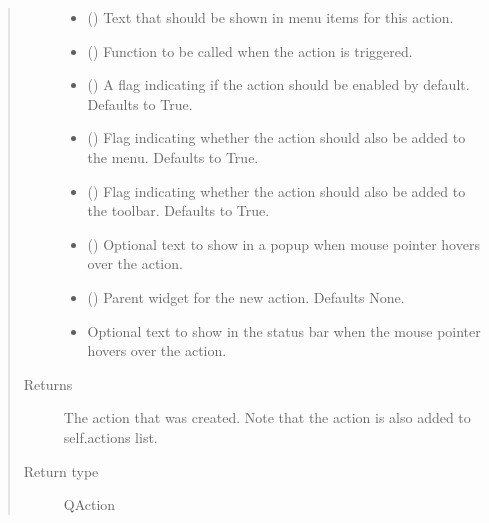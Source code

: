 \documentclass[letterpaper,10pt,english]{sphinxmanual}
\begin{document}
\begin{fulllineitems}
\begin{fulllineitems}
\begin{quote}
\begin{description}
\begin{itemize}
\item {} 
 () \textendash{} Text that should be shown in menu items for this action.

\item {} 
 () \textendash{} Function to be called when the action is triggered.

\item {} 
 () \textendash{} A flag indicating if the action should be enabled
by default. Defaults to True.

\item {} 
 () \textendash{} Flag indicating whether the action should also
be added to the menu. Defaults to True.

\item {} 
 () \textendash{} Flag indicating whether the action should also
be added to the toolbar. Defaults to True.

\item {} 
 () \textendash{} Optional text to show in a popup when mouse pointer
hovers over the action.

\item {} 
 () \textendash{} Parent widget for the new action. Defaults None.

\item {} 
 \textendash{} Optional text to show in the status bar when the
mouse pointer hovers over the action.

\end{itemize}

\item[{Returns}] \leavevmode
The action that was created. Note that the action is also
added to self.actions list.

\item[{Return type}] \leavevmode
QAction


\end{description}
\end{quote}
\end{fulllineitems}
\end{fulllineitems}
\end{document}
